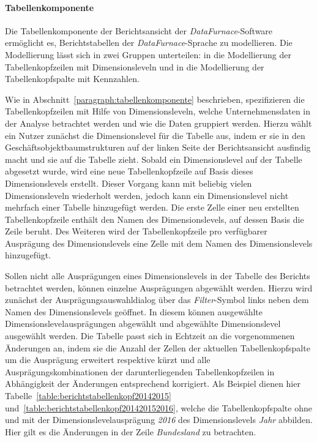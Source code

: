 \documentclass[
  language=german, %
  type=bachelor%
]{isthesis}
\begin{document}
\begin{content}
  \paragraph{Tabellenkomponente}

  Die Tabellenkomponente der Berichtsansicht der \textit{DataFurnace}-Software
  ermöglicht es, Berichtstabellen der \textit{DataFurnace}-Sprache zu
  modellieren. Die Modellierung lässt sich in zwei Gruppen unterteilen: in die
  Modellierung der Tabellenkopfzeilen mit Dimensionsleveln und in die
  Modellierung der Tabellenkopfspalte mit Kennzahlen.

  Wie in Abschnitt~\ref{paragraph:tabellenkomponente} beschrieben,
  spezifizieren die Tabellenkopfzeilen mit Hilfe von Dimensionsleveln, welche
  Unternehmensdaten in der Analyse betrachtet werden und wie die Daten
  gruppiert werden. Hierzu wählt ein Nutzer zunächst die Dimensionslevel für
  die Tabelle aus, indem er sie in den Geschäftsobjektbaumstrukturen auf der
  linken Seite der Berichtsansicht ausfindig macht und sie auf die Tabelle
  zieht. Sobald ein Dimensionslevel auf der Tabelle abgesetzt wurde, wird eine
  neue Tabellenkopfzeile auf Basis dieses Dimensionslevels erstellt. Dieser
  Vorgang kann mit beliebig vielen Dimensionsleveln wiederholt werden, jedoch
  kann ein Dimensionslevel nicht mehrfach einer Tabelle hinzugefügt werden. Die
  erste Zelle einer neu erstellten Tabellenkopfzeile enthält den Namen des
  Dimensionslevels, auf dessen Basis die Zeile beruht. Des Weiteren wird der
  Tabellenkopfzeile pro verfügbarer Ausprägung des Dimensionslevels eine Zelle
  mit dem Namen des Dimensionslevels hinzugefügt.

  Sollen nicht alle Ausprägungen eines Dimensionslevels in der Tabelle des
  Berichts betrachtet werden, können einzelne Ausprägungen abgewählt werden.
  Hierzu wird zunächst der Ausprägungsauswahldialog über das
  \textit{Filter}-Symbol links neben dem Namen des Dimensionslevels geöffnet.
  In diesem können ausgewählte Dimensionslevelausprägungen abgewählt und abgewählte
  Dimensionslevel ausgewählt werden. Die Tabelle passt sich in Echtzeit an die
  vorgenommenen Änderungen an, indem sie die Anzahl der Zellen der aktuellen
  Tabellenkopfspalte um die Ausprägung erweitert respektive kürzt und alle
  Ausprägungskombinationen der darunterliegenden Tabellenkopfzeilen in
  Abhängigkeit der Änderungen entsprechend korrigiert. Als Beispiel dienen hier
  Tabelle~\ref{table:berichtstabellenkopf20142015}
  und~\ref{table:berichtstabellenkopf201420152016}, welche die Tabellenkopfspalte
  ohne und mit der Dimensionslevelausprägung \textit{2016} des Dimensionslevels
  \textit{Jahr} abbilden. Hier gilt es die Änderungen in der Zeile
  \textit{Bundesland} zu betrachten.


\end{content}
\end{document}
